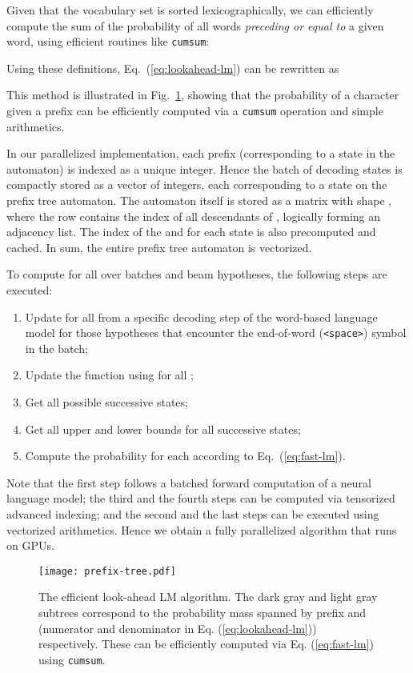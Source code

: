 \documentclass{article}
\begin{document}
Given that the vocabulary set is sorted lexicographically, we can efficiently compute the sum of the probability of all words \emph{preceding or equal to} a given word, using efficient routines like \texttt{cumsum}:


Using these definitions, Eq.~(\ref{eq:lookahead-lm}) can be rewritten as


This method is illustrated in Fig.~\ref{fig:prefix-tree}, showing that the probability of a character given a prefix can be efficiently computed via a \texttt{cumsum} operation and simple arithmetics.

In our parallelized implementation, each prefix  (corresponding to a state in the automaton) is indexed as a unique integer. Hence the batch of decoding states is compactly stored as a vector of integers, each corresponding to a state on the prefix tree automaton. The automaton itself is stored as a matrix  with shape , where the row  contains the index of all descendants of , logically forming an adjacency list. The index of the  and  for each state  is also precomputed and cached. In sum, the entire prefix tree automaton is vectorized.

To compute  for all  over batches and beam hypotheses, the following steps are executed:
\begin{enumerate}[label=(\roman*)]
    \item Update  for all  from a specific decoding step of the word-based language model for those hypotheses that encounter the end-of-word (\texttt{<space>}) symbol in the batch;
    \item Update the  function using  for all ;
    \item Get all possible successive states;
    \item Get all upper and lower bounds for all successive states;
    \item Compute the probability for each  according to Eq.~(\ref{eq:fast-lm}).
\end{enumerate}
Note that the first step follows a batched forward computation of a neural language model; the third and the fourth steps can be computed via tensorized advanced indexing; and the second and the last steps can be executed using vectorized arithmetics. Hence we obtain a fully parallelized algorithm that runs on GPUs.
\begin{figure}[t]
    \centering
    \texttt{[image: prefix-tree.pdf]}
    \caption{The efficient look-ahead LM algorithm. The dark gray and light gray subtrees correspond to the probability mass spanned by prefix  and  (numerator and denominator in Eq. (\ref{eq:lookahead-lm})) respectively. These can be efficiently computed via Eq. (\ref{eq:fast-lm}) using \texttt{cumsum}.}
    \label{fig:prefix-tree}
\end{figure}
\end{document}

